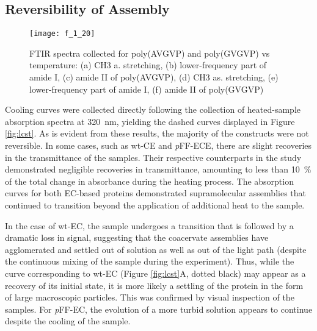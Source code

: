 \begin{refsection}
\subsection{Reversibility of Assembly}
\label{sec:reversibility}
\begin{figure}[h!] \centering \texttt{[image: f\_1\_20]}
    \caption[FTIR spectra collected for poly(AVGVP) and poly(GVGVP) vs
        temperature: (a) CH3 a. stretching, (b) lower-frequency part of amide I,
        (c) amide II of poly(AVGVP), (d) CH3 as. stretching, (e) lower-frequency
        part of amide I, (f) amide II of poly(GVGVP)]{FTIR spectra collected for
            poly(AVGVP) and poly(GVGVP) vs temperature: (a) CH3 a. stretching,
            (b) lower-frequency part of amide I, (c) amide II of poly(AVGVP),
            (d) CH3 as. stretching, (e) lower-frequency part of amide I, (f)
            amide II of poly(GVGVP)\cite{Schmidt2005}}\label{fig:lcst_cabello}
        \end{figure}
Cooling curves were collected directly following the collection of heated-sample
absorption spectra at \SI{320}{\nm}, yielding the dashed curves displayed in
Figure \ref{fig:lcst}. As is evident from these results, the majority of the
constructs were not reversible. In some cases, such as wt-CE and \emph{p}FF-ECE,
there are slight recoveries in the transmittance of the samples. Their
respective counterparts in the study demonstrated negligible recoveries in
transmittance, amounting to less than \SI{10}{\percent} of the total change in
absorbance during the heating process. The absorption curves for both EC-based
proteins demonstrated supramolecular assemblies that continued to transition
beyond the application of additional heat to the sample.

In the case of wt-EC, the sample undergoes a transition that is followed by a
dramatic loss in signal, suggesting that the coacervate assemblies have
agglomerated and settled out of solution as well as out of the light path
(despite the continuous mixing of the sample during the experiment). Thus, while
the curve corresponding to wt-EC (Figure \ref{fig:lcst}A, dotted black) may
appear as a recovery of its initial state, it is more likely a settling of the
protein in the form of large macroscopic particles. This was confirmed by visual
inspection of the samples. For \emph{p}FF-EC, the evolution of a more turbid
solution appears to continue despite the cooling of the sample.


\end{refsection}
